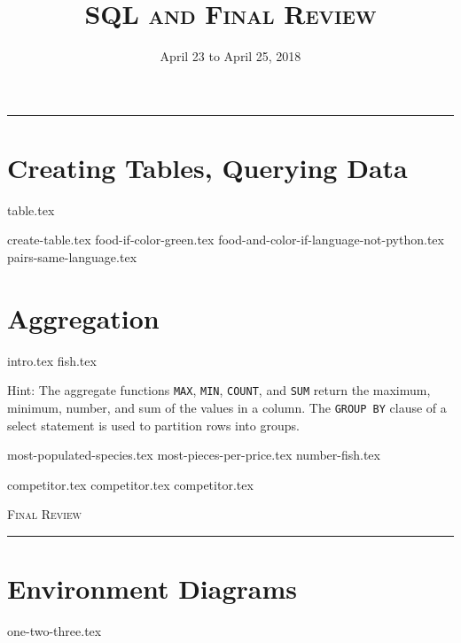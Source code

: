 \documentclass{exam}
\title{\textsc{SQL and Final Review}}
\date{April 23 to April 25, 2018}
\begin{document}
\maketitle
\rule{\textwidth}{0.15em}
\fontsize{12}{15}\selectfont

\section{Creating Tables, Querying Data}
{table.tex}
\begin{questions}
{create-table.tex}
\newpage
{food-if-color-green.tex}
{food-and-color-if-language-not-python.tex}
{pairs-same-language.tex}
\end{questions}

\newpage
\section{Aggregation}
{intro.tex}
{fish.tex}

Hint: The aggregate functions \texttt{MAX}, \texttt{MIN}, \texttt{COUNT}, and \texttt{SUM} return the maximum, minimum, number, and sum of the values in a column. The  \texttt{GROUP BY} clause of a select statement is used to partition rows into groups.

\begin{questions}
{most-populated-species.tex}
{most-pieces-per-price.tex}
{number-fish.tex}

\newpage
{competitor.tex}
{competitor.tex}
{competitor.tex}
\end{questions}

\newpage
{\huge \vspace*{0.5cm} \textsc{Final Review}}

\rule{\textwidth}{0.15em}

\section{Environment Diagrams}
\begin{questions}
{one-two-three.tex}
\end{questions}
\end{document}
